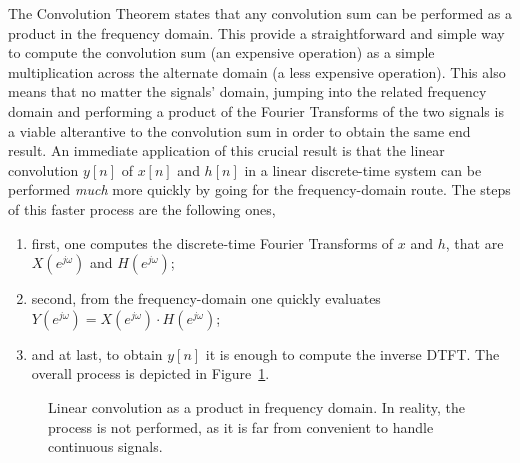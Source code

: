 \documentclass[\documentfontsize, twocolumn]{\classname}
\begin{document}
The Convolution Theorem states that any convolution sum can be performed as a product in the frequency domain. This provide a straightforward and simple way to compute the convolution sum (an expensive operation) as a simple multiplication across the alternate domain (a less expensive operation). This also means that no matter the signals' domain, jumping into the related frequency domain and performing a product of the Fourier Transforms of the two signals is a viable alterantive to the convolution sum in order to obtain the same end result.
An immediate application of this crucial result is that the linear convolution $y[n]$ of $x[n]$ and $h[n]$ in a linear discrete-time system can be performed \emph{much} more quickly by going for the frequency-domain route. The steps of this faster process are the following ones,
\begin{enumerate}
    \item first, one computes the discrete-time Fourier Transforms of $x$ and $h$, that are $X(e^{j\omega})$ and $H(e^{j\omega})$;
    \item second, from the frequency-domain one quickly evaluates $Y(e^{j\omega}) = X(e^{j\omega})\cdot H(e^{j\omega})$;
    \item and at last, to obtain $y[n]$ it is enough to compute the inverse DTFT. The overall process is depicted in Figure~\ref{tikz:linearConvolutionFrequencyDomain}.
\end{enumerate}
\begin{figure}[ht]
\begin{center}
    \caption{Linear convolution as a product in frequency domain. In reality, the process is not performed, as it is far from convenient to handle continuous signals.}\label{tikz:linearConvolutionFrequencyDomain}
\end{center}
\end{figure}
\end{document}
